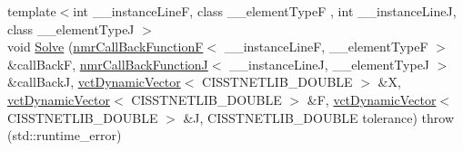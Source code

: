 {\bf }\par
\begin{DoxyCompactItemize}
\item 
{\footnotesize template$<$int \+\_\+\+\_\+instance\+Line\+F, class \+\_\+\+\_\+element\+Type\+F , int \+\_\+\+\_\+instance\+Line\+J, class \+\_\+\+\_\+element\+Type\+J $>$ }\\void \hyperlink{classnmr_l_s_non_lin_jacobian_solver_a2749b26c254243ea8769b96dd565e806}{Solve} (\hyperlink{classnmr_call_back_function_f}{nmr\+Call\+Back\+Function\+F}$<$ \+\_\+\+\_\+instance\+Line\+F, \+\_\+\+\_\+element\+Type\+F $>$ \&call\+Back\+F, \hyperlink{classnmr_call_back_function_j}{nmr\+Call\+Back\+Function\+J}$<$ \+\_\+\+\_\+instance\+Line\+J, \+\_\+\+\_\+element\+Type\+J $>$ \&call\+Back\+J, \hyperlink{classvct_dynamic_vector}{vct\+Dynamic\+Vector}$<$ C\+I\+S\+S\+T\+N\+E\+T\+L\+I\+B\+\_\+\+D\+O\+U\+B\+L\+E $>$ \&X, \hyperlink{classvct_dynamic_vector}{vct\+Dynamic\+Vector}$<$ C\+I\+S\+S\+T\+N\+E\+T\+L\+I\+B\+\_\+\+D\+O\+U\+B\+L\+E $>$ \&F, \hyperlink{classvct_dynamic_vector}{vct\+Dynamic\+Vector}$<$ C\+I\+S\+S\+T\+N\+E\+T\+L\+I\+B\+\_\+\+D\+O\+U\+B\+L\+E $>$ \&J, C\+I\+S\+S\+T\+N\+E\+T\+L\+I\+B\+\_\+\+D\+O\+U\+B\+L\+E tolerance)  throw (std\+::runtime\+\_\+error)
\end{DoxyCompactItemize}

